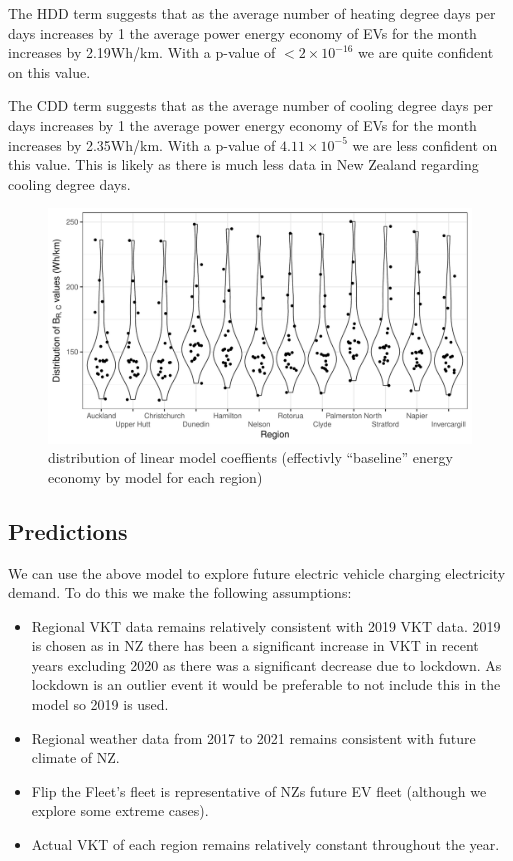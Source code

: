 \documentclass[
]{article}
\begin{document}
The HDD term suggests that as the average number of heating degree days
per days increases by 1 the average power energy economy of EVs for the
month increases by 2.19Wh/km. With a p-value of \(<2\times10^{-16}\) we
are quite confident on this value.

The CDD term suggests that as the average number of cooling degree days
per days increases by 1 the average power energy economy of EVs for the
month increases by 2.35Wh/km. With a p-value of \(4.11\times10^{-5}\) we
are less confident on this value. This is likely as there is much less
data in New Zealand regarding cooling degree days.

\begin{figure}
\centering
\includegraphics{final_report_files/figure-latex/consum_den-1.pdf}
\caption{distribution of linear model coeffients (effectivly
``baseline'' energy economy by model for each
region)\label{fig:consum_den}}
\end{figure}

\hypertarget{predictions}{%
\subsection{Predictions}\label{predictions}}

We can use the above model to explore future electric vehicle charging
electricity demand. To do this we make the following assumptions:

\begin{itemize}
\item Regional VKT data remains relatively consistent with 2019 VKT data. 2019 is chosen as in NZ there has been a significant increase in VKT in recent years excluding 2020 as there was a significant decrease due to lockdown. As lockdown is an outlier event it would be preferable to not include this in the model so 2019 is used.
\item Regional weather data from 2017 to 2021 remains consistent with future climate of NZ.
\item Flip the Fleet's fleet is representative of NZs future EV fleet (although we explore some extreme cases).
\item Actual VKT of each region remains relatively constant throughout the year.
\end{itemize}
\end{document}
